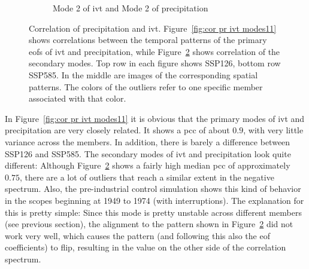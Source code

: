 \begin{figure}[!htbp]
\begin{subfigure}[b]{0.95\textwidth}
    \caption{Mode 2 of \ac{ivt} and Mode 2 of precipitation}
    \label{fig:cor pr ivt modes22}
  \end{subfigure}
  \caption[Correlation Boxplots of IVT and PR EOF Modes]{Correlation of precipitation and \ac{ivt}. Figure~\ref{fig:cor pr ivt modes11} shows correlations between the temporal patterns of the primary \acp{eof} of \ac{ivt} and precipitation, while Figure~\ref{fig:cor pr ivt modes22} shows correlation of the secondary modes. Top row in each figure shows SSP126, bottom row SSP585. In the middle are images of the corresponding spatial patterns. The colors of the outliers refer to one specific member associated with that color.}
\end{figure}


In Figure~\ref{fig:cor pr ivt modes11} it is obvious that the primary modes of \ac{ivt} and precipitation are very closely related. 
It shows a \ac{pcc} of about $0.9$, with very little variance across the members. 
In addition, there is barely a difference between SSP126 and SSP585. 
The secondary modes of \ac{ivt} and precipitation look quite different:
Although Figure~\ref{fig:cor pr ivt modes22} shows a fairly high median \ac{pcc} of approximately $0.75$, there are a lot of outliers that reach a similar extent in the negative spectrum. 
Also, the pre-industrial control simulation shows this kind of behavior in the scopes beginning at 1949 to 1974 (with interruptions). 
The explanation for this is pretty simple: Since this mode is pretty unstable across different members (see previous section), the alignment to the pattern shown in Figure~\ref{fig:cor pr ivt modes22} did not work very well, which causes the pattern (and following this also the \ac{eof} coefficients) to flip, resulting in the value on the other side of the correlation spectrum. 



